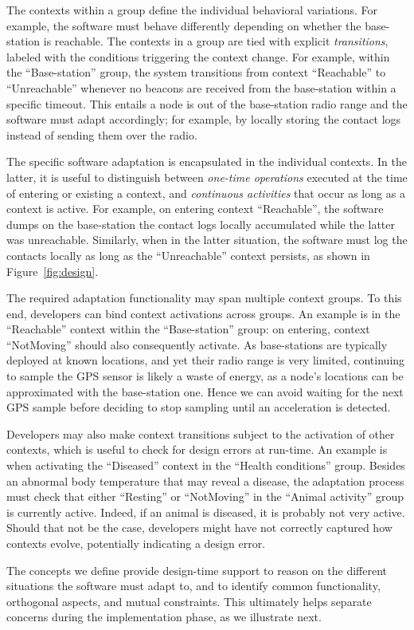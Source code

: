 The contexts within a group define the individual behavioral
variations. For example, the software must behave differently
depending on whether the base-station is reachable.  The contexts in a
group are tied with explicit \emph{transitions}, labeled with the
conditions triggering the context change. For example, within the
``Base-station'' group, the system transitions from context
``Reachable'' to ``Unreachable'' whenever no beacons are received from
the base-station within a specific timeout. This entails a node is out
of the base-station radio range and the software must adapt
accordingly; for example, by locally storing the contact logs instead
of sending them over the radio.

The specific software adaptation is encapsulated in the individual
contexts. In the latter, it is useful to distinguish between \emph{one-time
  operations} executed at the time of entering or existing a context,
and \emph{continuous activities} that occur as long as a context is
active. For example, on entering context ``Reachable'', the software
dumps on the base-station the contact logs locally accumulated while
the latter was unreachable. Similarly, when in the latter situation,
the software must log the contacts locally as long as the
``Unreachable'' context persists, as shown in Figure~\ref{fig:design}.

The required adaptation functionality may span multiple context
groups. To this end, developers can bind context activations across
groups. An example is in the ``Reachable'' context within the
``Base-station'' group: on entering, context ``NotMoving'' should
also consequently activate. As base-stations are typically deployed at
known locations, and yet their radio range is very limited, continuing
to sample the GPS sensor is likely a waste of energy, as a node's
locations can be approximated with the base-station one. Hence we can
avoid waiting for the next GPS sample before deciding to stop
sampling until an acceleration is detected.

Developers may also make context transitions subject to the activation
of other contexts, which is useful to check for design errors at
run-time. An example is when activating the ``Diseased'' context in
the ``Health conditions'' group. Besides an abnormal body temperature
that may reveal a disease, the adaptation process must check that
either ``Resting'' or ``NotMoving'' in the ``Animal activity'' group
is currently active. Indeed, if an animal is diseased, it is probably
not very active. Should that not be the case, developers might have
not correctly captured how contexts evolve, potentially indicating a
design error.

The concepts we define provide design-time support to reason on the
different situations the software must adapt to, and to identify common
functionality, orthogonal aspects, and mutual constraints. This
ultimately helps separate concerns during the implementation phase, as
we illustrate next.



